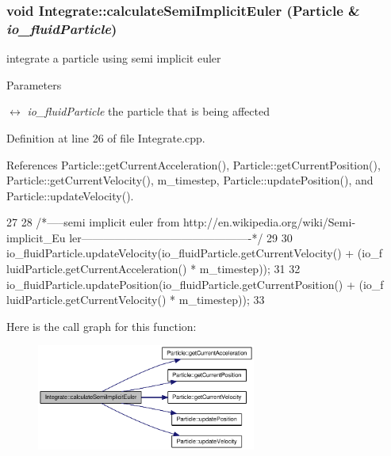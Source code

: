\hypertarget{class_integrate_ae9b7697b3cf896e6db63fc9653846591}{
\subsubsection[{calculateSemiImplicitEuler}]{\setlength{\rightskip}{0pt plus 5cm}void Integrate::calculateSemiImplicitEuler ({\bf Particle} \& {\em io\_\-fluidParticle})}}
\label{class_integrate_ae9b7697b3cf896e6db63fc9653846591}


integrate a particle using semi implicit euler 


\begin{DoxyParams}{Parameters}
\item[\mbox{$\leftrightarrow$} {\em io\_\-fluidParticle}]the particle that is being affected \end{DoxyParams}


Definition at line 26 of file Integrate.cpp.



References Particle::getCurrentAcceleration(), Particle::getCurrentPosition(), Particle::getCurrentVelocity(), m\_\-timestep, Particle::updatePosition(), and Particle::updateVelocity().




\begin{DoxyCode}
27 {
28     /*-----semi implicit euler from http://en.wikipedia.org/wiki/Semi-implicit_Eu
      ler----------------------------------------------*/
29 
30     io_fluidParticle.updateVelocity(io_fluidParticle.getCurrentVelocity() + (io_f
      luidParticle.getCurrentAcceleration() * m_timestep));
31 
32     io_fluidParticle.updatePosition(io_fluidParticle.getCurrentPosition() + (io_f
      luidParticle.getCurrentVelocity() * m_timestep));
33 }
\end{DoxyCode}




Here is the call graph for this function:\nopagebreak
\begin{figure}[H]
\begin{center}
\leavevmode
\includegraphics[width=204pt]{class_integrate_ae9b7697b3cf896e6db63fc9653846591_cgraph}
\end{center}
\end{figure}




